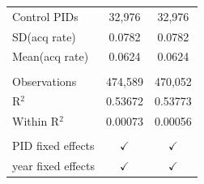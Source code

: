 \begin{tabular}{lcc}
   Control PIDs                               & 32,976         & 32,976\\  
   SD(acq rate)                               & 0.0782         & 0.0782\\  
   Mean(acq rate)                             & 0.0624         & 0.0624\\  
    \\
   Observations                               & 474,589        & 470,052\\  
   R$^2$                                      & 0.53672        & 0.53773\\  
   Within R$^2$                               & 0.00073        & 0.00056\\  
    \\
   PID fixed effects                          & $\checkmark$   & $\checkmark$\\   
   year fixed effects                         & $\checkmark$   & $\checkmark$\\   
   \bottomrule
\end{tabular}
\par\endgroup


